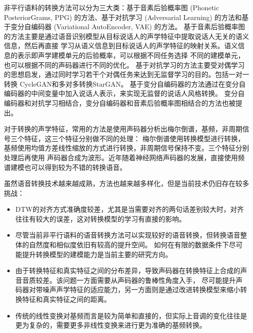非平行语料的转换方法可以分为三大类：基于音素后验概率图 (Phonetic PosteriorGrams, PPG) 的方法、基于对抗学习 (Adversarial Learning) 的方法和基于变分自编码器 (Variational AutoEncoder, VAE) 的方法。
基于音素后验概率图的方法主要是通过语音识别模型从目标说话人的声学特征中提取说话人无关的语义信息，然后再直接
学习从语义信息到目标说话人的声学特征的映射关系\cite{sun2016phonetic}。语义信息的表示即声学建模单元的后验概率，可以根据不同任务选择
不同的建模单元，也可以根据不同的声码器进行不同的优化\cite{liu2018hccl,lu2019compact,liu2019jointly,zhou2019cross}。
基于对抗学习的方法主要受对偶学习的思想启发，通过同时学习若干个对偶任务来达到无监督学习的目的。包括一对一转换
CycleGAN\cite{kaneko2017parallel,kaneko2019cyclegan}和多对多转换StarGAN\cite{kameoka2018stargan,kaneko2019stargan}。
基于变分自编码器的方法通过在变分自编码器的中间变量中加入说话人表示，来实现无监督的说话人风格转换\cite{hsu2016voice,kameoka2019acvae}。
变分自编码器和对抗学习相结合\cite{hsu2017voice}，变分自编码器和音素后验概率图相结合\cite{saito2018non}的方法也被提出。

% 

对于转换的声学特征，常用的方法是使用声码器分析出梅尔倒谱，基频，非周期信号三个特征，这三个特征分别做不同的处理：
梅尔倒谱使用转换模型进行转换，基频使用均值方差线性缩放的方式进行转换，非周期信号保持不变。三个特征分别处理后再使用
声码器合成为波形。近年随着神经网络声码器的发展，直接使用频谱建模也可以得到较为不错的转换语音。



虽然语音转换技术越来越成熟，方法也越来越多样化，但是当前技术仍旧存在较多挑战：
\begin{itemize}
    \item DTW的对齐方式准确度较差，尤其是当需要对齐的两句话差别较大时，对齐往往有较大的误差，这对转换模型的学习有直接的影响。
    \item 尽管当前非平行语料的语音转换方法可以实现较好的语音转换，但转换语音整体的自然度和相似度依旧有较高的提升空间。
    如何在有限的数据条件下尽可能提升转换模型的建模能力是当前主要的研究方向。
    \item 由于转换特征和真实特征之间的分布差异，导致声码器在转换特征上合成的声音音质较差。该问题一方面需要从声码器的鲁棒性角度入手，
    尽可能提升声码器对带噪声声学特征的适应能力，另一方面则是通过改进转换模型来缩小转换特征和真实特征之间的距离。
    \item 传统的线性变换对基频而言是较为简单和直接的，但实际上音调的变化往往是更为复杂的，需要更多非线性变换来进行更为准确的基频转换。
\end{itemize}

